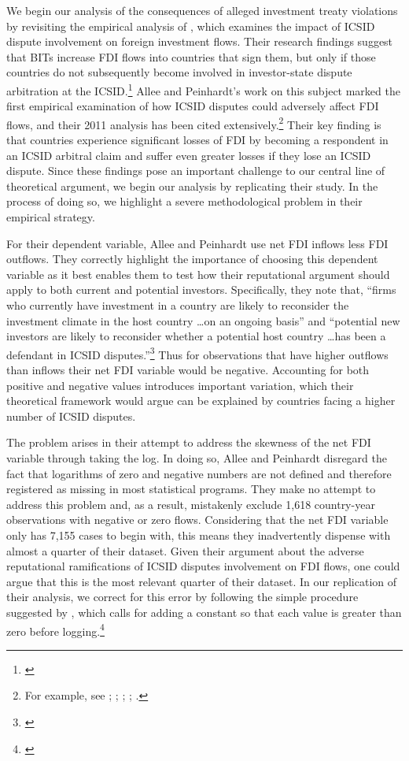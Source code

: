 \documentclass[12pt,onesided]{amsart}
\begin{document}
We begin our analysis of the consequences of alleged investment treaty violations by revisiting the empirical analysis of \citeauthor{allee:peinhardt:2011}, which examines the impact of ICSID dispute involvement on foreign investment flows. Their research findings suggest that BITs increase FDI flows into countries that sign them, but only if those countries do not subsequently become involved in investor-state dispute arbitration at the ICSID.\footnote{\citet{allee:peinhardt:2011}} Allee and Peinhardt's work on this subject marked the first empirical examination of how ICSID disputes could adversely affect FDI flows, and their 2011 analysis has been cited extensively.\footnote{For example, see \citet{berger2011more}; \citet{poulsen2013claim}; \citet{wellhausen2013}; \citet{haftel2013delayed}; \citet{kerner2014}.} Their key finding is that countries experience significant losses of FDI by becoming a respondent in an ICSID arbitral claim and suffer even greater losses if they lose an ICSID dispute. Since these findings pose an important challenge to our central line of theoretical argument, we begin our analysis by replicating their study. In the process of doing so, we highlight a severe methodological problem in their empirical strategy.

For their dependent variable, Allee and Peinhardt use net FDI inflows less FDI outflows. They correctly highlight the importance of choosing this dependent variable as it best enables them to test how their reputational argument should apply to both current and potential investors. Specifically, they note that, ``firms who currently have investment in a country are likely to reconsider the investment climate in the host country \ldots on an ongoing basis'' and ``potential new investors are likely to reconsider whether a potential host country \ldots has been a defendant in ICSID disputes.''\footnote{\citet[p. 419--420]{allee:peinhardt:2011}} Thus for observations that have higher outflows than inflows their net FDI variable would be negative. Accounting for both positive and negative values introduces important variation, which their theoretical framework would argue can be explained by countries facing a higher number of ICSID disputes. 

The problem arises in their attempt to address the skewness of the net FDI variable through taking the log. In doing so, Allee and Peinhardt disregard the fact that logarithms of zero and negative numbers are not defined and therefore registered as missing in most statistical programs. They make no attempt to address this problem and, as a result, mistakenly exclude 1,618 country-year observations with negative or zero flows. Considering that the net FDI variable only has 7,155 cases to begin with, this means they inadvertently dispense with almost a quarter of their dataset. Given their argument about the adverse reputational ramifications of ICSID disputes involvement on FDI flows, one could argue that this is the most relevant quarter of their dataset. In our replication of their analysis, we correct for this error by following the simple procedure suggested by \citeauthor{li:2009}, which calls for adding a constant so that each value is greater than zero before logging.\footnote{\citet{li:2009}} 
\end{document}
